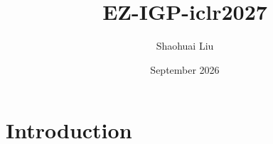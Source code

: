 \documentclass{article}
\title{EZ-IGP-iclr2027}
\author{Shaohuai Liu}
\date{September 2026}
\begin{document}
\maketitle

\section{Introduction}
\end{document}
